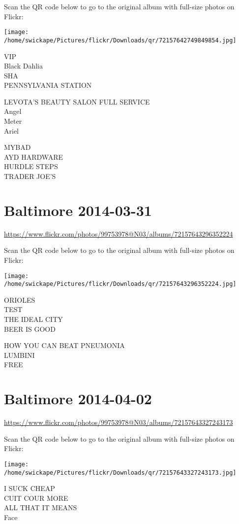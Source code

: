 \documentclass[10pt,letterpaper]{article}
\begin{document}
Scan the QR code below to go to the original album with full-size photos on Flickr:

\texttt{[image: /home/swickape/Pictures/flickr/Downloads/qr/72157642749849854.jpg]}


VIP\\
Black Dahlia\\
SHA\\
PENNSYLVANIA STATION

LEVOTA'S BEAUTY SALON FULL SERVICE\\
Angel\\
Meter\\
Ariel

MYBAD\\
AYD HARDWARE\\
HURDLE STEPS\\
TRADER JOE'S


\section*{Baltimore 2014-03-31}

\url{https://www.flickr.com/photos/99753978@N03/albums/72157643296352224}

Scan the QR code below to go to the original album with full-size photos on Flickr:

\texttt{[image: /home/swickape/Pictures/flickr/Downloads/qr/72157643296352224.jpg]}


ORIOLES\\
TEST\\
THE IDEAL CITY\\
BEER IS GOOD

HOW YOU CAN BEAT PNEUMONIA\\
LUMBINI\\
FREE


\section*{Baltimore 2014-04-02}

\url{https://www.flickr.com/photos/99753978@N03/albums/72157643327243173}

Scan the QR code below to go to the original album with full-size photos on Flickr:

\texttt{[image: /home/swickape/Pictures/flickr/Downloads/qr/72157643327243173.jpg]}


I SUCK CHEAP\\
CUIT COUR MORE\\
ALL THAT IT MEANS\\
Face
\end{document}
